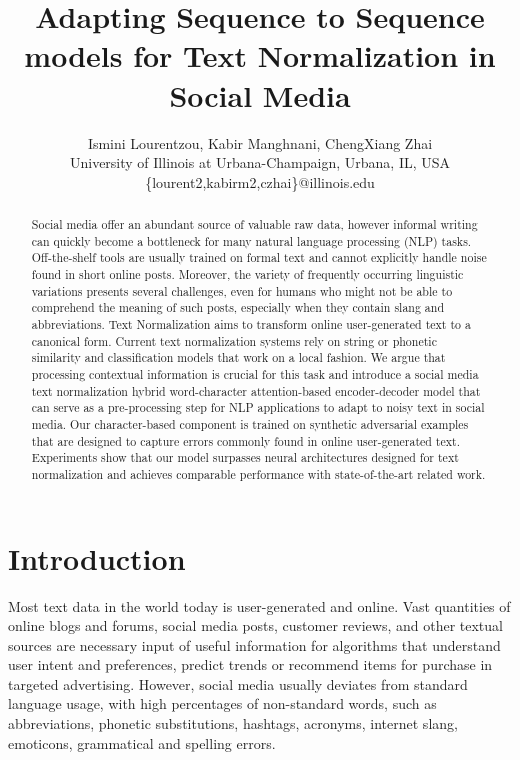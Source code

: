 \documentclass[letterpaper]{article} \usepackage{aaai19}  \usepackage{times}  \usepackage{helvet} \usepackage{courier}  \usepackage[hyphens]{url}  \usepackage{graphicx} \urlstyle{rm} \def\UrlFont{\rm}  \usepackage{graphicx}  \frenchspacing  \setlength{\pdfpagewidth}{8.5in}  \setlength{\pdfpageheight}{11in}
\newcommand{\hide}[1]{} \newcommand{\ag}[1]{\textsf{\textbf{\color{red}{[AG: #1]}}}}
\begin{document}
\title{Adapting Sequence to Sequence models for Text Normalization in Social Media}
\author{
Ismini Lourentzou,
Kabir Manghnani,
ChengXiang Zhai \\
University of Illinois at Urbana-Champaign, Urbana, IL, USA \\
\{lourent2,kabirm2,czhai\}@illinois.edu
}
\maketitle

\begin{abstract}
\hide{The advancement of NLP research has relied on the availability of academic annotated datasets from clean formal textual sources, such as books and news articles.} Social media offer an abundant source of valuable raw data, however informal writing can quickly become a bottleneck for many natural language processing (NLP) tasks. Off-the-shelf tools are usually trained on formal text and cannot explicitly handle noise found in short online posts. Moreover, the variety of frequently occurring linguistic variations presents several challenges, even for humans who might not be able to comprehend the meaning of such posts, especially when they contain slang and abbreviations. Text Normalization aims to transform  online user-generated text to a canonical form. Current text normalization systems rely on string or phonetic similarity and classification models that work on a local fashion. We argue that processing contextual information is crucial for this task and introduce a social media text normalization hybrid word-character attention-based encoder-decoder model that can serve as a pre-processing step for NLP applications to adapt to noisy text in social media. Our character-based component is trained on synthetic adversarial examples that are designed to capture errors commonly found in online user-generated text. Experiments show that our model surpasses neural architectures designed for text normalization and achieves comparable performance with state-of-the-art related work.
\end{abstract}


\section{Introduction}
Most text data in the world today is user-generated and online. Vast quantities of online blogs and forums, social media posts, customer reviews, and other textual sources are necessary input of useful information for algorithms that understand user intent and preferences, predict trends or recommend items for purchase in targeted advertising. 
However, social media usually deviates from standard language usage, with high percentages of non-standard words, such as abbreviations, phonetic substitutions, hashtags, acronyms, internet slang, emoticons, grammatical and spelling errors.
\end{document}
